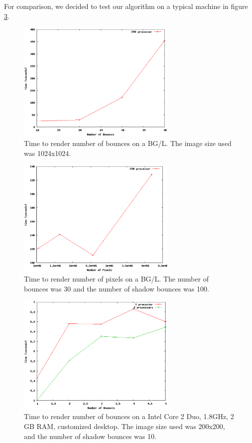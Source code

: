 \documentclass{acmsiggraph}
\begin{document}
For comparison, we decided to test our algorithm on a typical machine in figure 
\ref{plot_taro_desktop}.

\begin{figure}[htp]
\centering
\includegraphics[width=3in]{blue_gene_bounces_plot}
\caption{Time to render number of bounces on a BG/L. The image size used was 1024x1024.}
\label{plot_bgl_bounces}
\end{figure}

\begin{figure}[htp]
\centering
\includegraphics[width=3in]{blue_gene_pixels_plot}
\caption{Time to render number of pixels on a BG/L. The number of bounces was 30 and the number of shadow bounces was 100.}
\label{plot_bgl_pixels}
\end{figure}

\begin{figure}[htp]
\centering
\includegraphics[width=3in]{taro_desktop_plot}
\caption{Time to render number of bounces on a Intel Core 2 Duo, 1.8GHz, 2 GB RAM, customized desktop. The image size used was 200x200, and the number of shadow bounces was 10.}
\label{plot_taro_desktop}
\end{figure}
\end{document}
